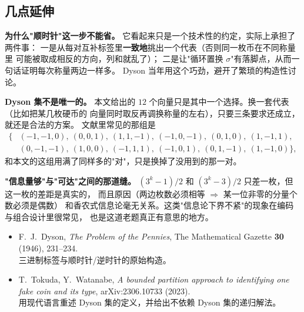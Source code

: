 \documentclass[UTF8,11pt,fontset=macnew]{ctexart}
\begin{document}
\subsection{几点延伸}

\textbf{为什么"顺时针"这一步不能省。}
它看起来只是一个技术性的约定，实际上承担了两件事：
一是从每对互补标签里\textbf{一致地}挑出一个代表（否则同一枚币在不同称量里
可能被取成相反的方向，列和就乱了）；
二是让"循环置换 $\sigma$"有落脚点，从而一句话证明每次称量两边一样多。
Dyson 当年用这个巧劲，避开了繁琐的构造性讨论。

\textbf{Dyson 集不是唯一的。}
本文给出的 $12$ 个向量只是其中一个选择。换一套代表（比如把某几枚硬币的
向量同时取反再调换称量的左右），只要三条要求还成立，就还是合法的方案。
文献里常见的那组是
\[
\begin{aligned}
\{&(-1,-1,0),\ (0,0,1),\ (1,1,-1),\ (-1,0,-1),\ (0,1,0),\ (1,-1,1),\\
 &(0,-1,-1),\ (1,0,0),\ (-1,1,1),\ (-1,0,1),\ (0,1,-1),\ (1,-1,0)\},
\end{aligned}
\]
和本文的这组用满了同样多的"对"，只是换掉了没用到的那一对。

\textbf{"信息量够"与"可达"之间的那道缝。}
$(3^k-1)/2$ 和 $(3^k-3)/2$ 只差一枚，但这一枚的差距是真实的，
而且原因（两边枚数必须相等 $\Rightarrow$ 某一位非零的分量个数必须是偶数）
和香农式信息论毫无关系。这类"信息论下界不紧"的现象在编码与组合设计里很常见，
也是这道老题真正有意思的地方。

\begin{keybox}[参考]
\begin{itemize}
  \item F.~J.~Dyson, \textit{The Problem of the Pennies},
        The Mathematical Gazette \textbf{30} (1946), 231--234. \\
        三进制标签与顺时针/逆时针的原始构造。
  \item T.~Tokuda, Y.~Watanabe,
        \textit{A bounded partition approach to identifying one fake coin and its type},
        arXiv:2306.10733 (2023). \\
        用现代语言重述 Dyson 集的定义，并给出不依赖 Dyson 集的递归解法。
\end{itemize}
\end{keybox}
\end{document}
